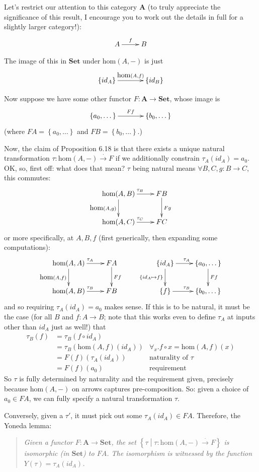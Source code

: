 \documentclass[10pt,letterpaper]{article}
\newcommand{\set}[1]{\left\{#1\right\}}
\begin{document}
Let's restrict our attention to this category $\mathbf{A}$
(to truly appreciate the significance of this result, I encourage you to work out
the details in full for a slightly larger category!):
\[ \xymatrix{ A \ar[r]^f & B } \]

The image of this in $\mathbf{Set}$ under $\mbox{hom}(A,-)$ is just
\[ \xymatrix@C=.5in{ \set{id_A} \ar[r]^{\mbox{hom}(A,f)} & \set{id_B} } \]

Now suppose we have some other functor $F : \mathbf{A} \to \mathbf{Set}$,
whose image is
\[ \xymatrix@C=.5in{ \set{a_0, \dots} \ar[r]^{Ff} & \set{b_0, \dots} } \]
(where $FA = \set{a_0, \dots}$ and $FB = \set{b_0, \dots}$.)

Now, the claim of Proposition 6.18 is that there exists a unique natural
transformation $\tau : \mbox{hom}(A,-) \stackrel{\cdot}{\to} F$ if we additionally
constrain $\tau_A(id_A) = a_0$.  OK, so, first off: what does that mean? $\tau$ being
natural means $\forall B,C,g : B \to C$, this commutes:
\[ \xymatrix{
  \mbox{hom}(A,B) \ar[r]^{\tau_B} \ar[d]_{\mbox{hom}(A,g)} & FB \ar[d]^{Fg} \\
  \mbox{hom}(A,C) \ar[r]^{\tau_C} & FC 
} \]
or more specifically, at $A,B,f$ (first generically, then expanding some computations):
\[ \xymatrix{
  \mbox{hom}(A,A) \ar[r]^{\tau_A} \ar[d]_{\mbox{hom}(A,f)} & FA \ar[d]^{Ff} \\
  \mbox{hom}(A,B) \ar[r]^{\tau_B} & FB 
} \qquad \xymatrix{
  \set{id_A} \ar[r]^{\tau_A} \ar[d]_{\set{id_A \mapsto f}} & \set{a_0,\dots} \ar[d]^{Ff} \\
  \set{f} \ar[r]^{\tau_B} & \set{b_0,\dots}
} \]
and so requiring $\tau_A(id_A) = a_0$ makes sense.  If this is to be natural, it
must be the case (for all $B$ and $f : A \to B$; note that this works even to
define $\tau_A$ at inputs other than $id_A$ just as well!) that
\begin{align*}
  \tau_B(f) &= \tau_B(f \circ id_A) \\
            &= \tau_B(\mbox{hom}(A,f)(id_A)) & \forall_x . f \circ x = \mbox{hom}(A,f)(x) \\
            &= F(f)(\tau_A(id_A))            & \text{naturality of $\tau$} \\
            &= F(f)(a_0)                     & \text{requirement}
\end{align*}
So $\tau$ is fully determined by naturality and the requirement given,
precisely because $\mbox{hom}(A,-)$ on arrows captures pre-composition.
So: given a choice of $a_0 \in FA$, we can fully specify a natural transformation $\tau$.


Conversely, given a $\tau'$, it must pick out some $\tau_A(id_A) \in FA$.  Therefore,
the Yoneda lemma:

\begin{quote}{\em
  Given a functor $F : \mathbf{A} \to \mathbf{Set}$, the set
  $\set{\tau \middle\vert \tau : \mbox{hom}(A,-) \stackrel{\cdot}{\to} F}$
  is isomorphic (in $\mathbf{Set}$) to $FA$.
  The isomorphism is witnessed by the function $Y(\tau) = \tau_A(id_A)$.
}\end{quote}
\end{document}
